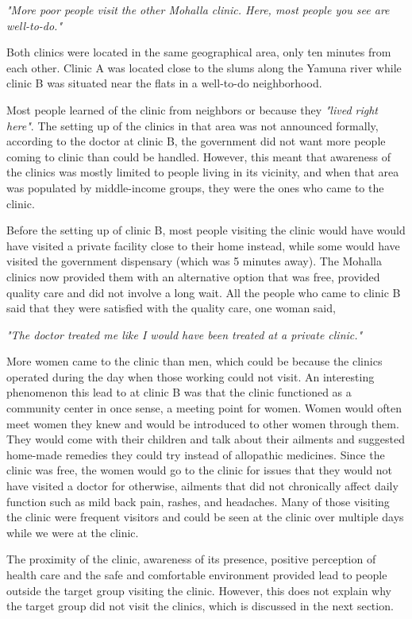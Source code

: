 \textit{"More poor people visit the other Mohalla clinic. Here, most people you see are well-to-do."} 

Both clinics were located in the same geographical area, only ten minutes from each other. Clinic A was located close to the slums along the Yamuna river while clinic B was situated near the flats in a well-to-do neighborhood. %

Most people learned of the clinic from neighbors or because they \textit{"lived right here"}. The setting up of the clinics in that area was not announced formally, according to the doctor at clinic B, the government did not want more people coming to clinic than could be handled. However, this meant that awareness of the clinics was mostly limited to people living in its vicinity, and when that area was populated by middle-income groups, they were the ones who came to the clinic.

Before the setting up of clinic B, most people visiting the clinic would have would have visited a private facility close to their home instead, while some would have visited the government dispensary (which was 5 minutes away). The Mohalla clinics now provided them with an alternative option that was free, provided quality care and did not involve a long wait. All the people who came to clinic B said that they were satisfied with the quality care, one woman said,

\textit{"The doctor treated me like I would have been treated at a private clinic."}

More women came to the clinic than men, which could be because the clinics operated during the day when those working could not visit. An interesting phenomenon this lead to at clinic B was that the clinic functioned as a community center in once sense, a meeting point for women. Women would often meet women they knew and would be introduced to other women through them. They would come with their children and talk about their ailments and suggested home-made remedies they could try instead of allopathic medicines. Since the clinic was free, the women would go to the clinic for issues that they would not have visited a doctor for otherwise, ailments that did not chronically affect daily function such as mild back pain, rashes, and headaches. Many of those visiting the clinic were frequent visitors and could be seen at the clinic over multiple days while we were at the clinic. 

The proximity of the clinic, awareness of its presence, positive perception of health care and the safe and comfortable environment provided lead to people outside the target group visiting the clinic. However, this does not explain why the target group did not visit the clinics, which is discussed in the next section. 

